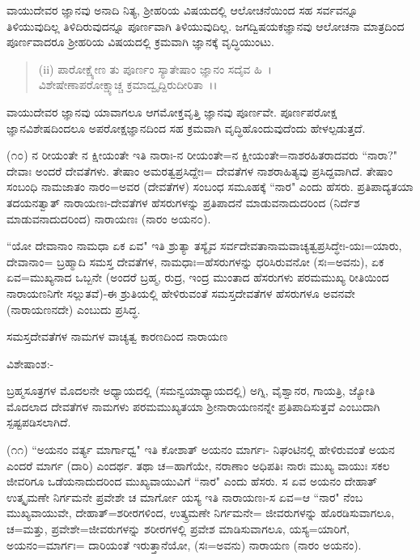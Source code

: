 ವಾಯುದೇವರ ಜ್ಞಾನವು ಅನಾದಿ ನಿತ್ಯ, ಶ‍್ರೀಹರಿಯ ವಿಷಯದಲ್ಲಿ ಆಲೋಚನೆಯಿಂದ ಸಹ ಸರ್ವವನ್ನೂ ತಿಳಿಯುವುದಿಲ್ಲ ತಿಳಿದಿರುವುದನ್ನೂ ಪೂರ್ಣವಾಗಿ ತಿಳಿಯುವುದಿಲ್ಲ. ಜಗದ್ವಿಷಯಕಜ್ಞಾನವು ಆಲೋಚನಾ ಮಾತ್ರದಿಂದ ಪೂರ್ಣವಾದರೂ ಶ‍್ರೀಹರಿಯ ವಿಷಯದಲ್ಲಿ ಕ್ರಮವಾಗಿ ಜ್ಞಾನಕ್ಕೆ ವೃದ್ಧಿಯುಂಟು.

\begin{verse}
 (ii) ಪಾರೋಕ್ಷ್ಯೇಣ ತು ಪೂರ್ಣಂ ಸ್ಯಾತೇಷಾಂ ಜ್ಞಾನಂ ಸದೈವ ಹಿ~।\\ ವಿಶೇಷೇಣಾಪರೋಕ್ಷ್ಯಾಚ್ಚ ಕ್ರಮಾದ್ವೃದ್ದಿರುದೀರಿತಾ~।।
\end{verse}


\noindent
ವಾಯುದೇವರ ಜ್ಞಾನವು ಯಾವಾಗಲೂ ಆಗಮೋಕ್ತವೃತ್ತಿ ಜ್ಞಾನವು ಪೂರ್ಣವೇ. ಪೂರ್ಣಪರೋಕ್ಷ ಜ್ಞಾನವಿಶೇಷದಿಂದಲೂ ಅಪರೋಕ್ಷಜ್ಞಾನದಿಂದ ಸಹ ಕ್ರಮವಾಗಿ ವೃದ್ಧಿಹೊಂದುವುದೆಂದು ಹೇಳಲ್ಪಡುತ್ತದೆ.

(೧೦) ನ ರೀಯಂತೇ ನ ಕ್ಷೀಯಂತೇ ಇತಿ ನಾರಾಃ-ನ ರೀಯಂತೇ=ನ ಕ್ಷೀಯಂತೇ=ನಾಶರಹಿತರಾದವರು ``ನಾರಾ?" ದೇವಾಃ ಅಂದರೆ ದೇವತೆಗಳು. ತೇಷಾಂ ಅಮರತ್ವಪ್ರಸಿದ್ದೇಃ= ದೇವತೆಗಳ ನಾಶರಾಹಿತ್ಯವು ಪ್ರಸಿದ್ದವಾಗಿದೆ. ತೇಷಾಂ ಸಂಬಂಧಿ ನಾಮಜಾತಂ ನಾರಂ=ಅವರ (ದೇವತೆಗಳ) ಸಂಬಂಧ ಸಮೂಹಕ್ಕೆ ``ನಾರ" ಎಂದು ಹೆಸರು. ಪ್ರತಿಪಾದ್ಯತಯಾ ತದಯನತ್ವಾತ್ ನಾರಾಯಣಃ-ದೇವತೆಗಳ ಹೆಸರುಗಳನ್ನು ಪ್ರತಿಪಾದನೆ ಮಾಡುವನಾದುದರಿಂದ (ನಿರ್ದೆಶ ಮಾಡುವನಾದುದರಿಂದ) ನಾರಾಯಣಃ (ನಾರಂ ಅಯನ೦).

``ಯೋ ದೇವಾನಾಂ ನಾಮಧಾ ಏಕ ಏವ" ಇತಿ ಶ್ರುತ್ಯಾ ತಸ್ಯೈವ ಸರ್ವದೇವತಾನಾಮವಾಚ್ಯತ್ವಪ್ರಸಿದ್ಧೇಃ-ಯಃ=ಯಾರು, ದೇವಾನಾಂ= ಬ್ರಹ್ಮಾದಿ ಸಮಸ್ತ ದೇವತೆಗಳ, ನಾಮಧಾಃ=ಹೆಸರುಗಳನ್ನು ಧರಿಸಿರುವನೋ (ಸಃ=ಅವನು), ಏಕ ಏವ=ಮುಖ್ಯನಾದ ಒಬ್ಬನೇ (ಅಂದರೆ ಬ್ರಹ್ಮ, ರುದ್ರ, ಇಂದ್ರ ಮುಂತಾದ ಹೆಸರುಗಳು ಪರಮಮುಖ್ಯ ರೀತಿಯಿಂದ ನಾರಾಯಣನಿಗೇ ಸಲ್ಲುತವೆ)-ಈ ಶ್ರುತಿಯಲ್ಲಿ ಹೇಳಿರುವಂತೆ ಸಮಸ್ತದೇವತೆಗಳ ಹೆಸರುಗಳೂ ಅವನವೇ (ನಾರಾಯಣನದೇ) ಎಂಬುದು ಪ್ರಸಿದ್ಧ.

\begin{center}
ಸಮಸ್ತದೇವತೆಗಳ ನಾಮಗಳ ವಾಚ್ಯತ್ವ ಕಾರಣದಿಂದ ನಾರಾಯಣ
\end{center}

\noindent
ವಿಶೇಷಾಂಶ:-

ಬ್ರಹ್ಮಸೂತ್ರಗಳ ಮೊದಲನೇ ಅಧ್ಯಾಯದಲ್ಲಿ (ಸಮನ್ವಯಾಧ್ಯಾಯದಲ್ಲಿ) ಅಗ್ನಿ, ವೈಶ್ವಾನರ, ಗಾಯತ್ರಿ, ಜ್ಯೋತಿ ಮೊದಲಾದ ದೇವತೆಗಳ ನಾಮಗಳು ಪರಮಮುಖ್ಯತಯಾ ಶ‍್ರೀನಾರಾಯಣನನ್ನೇ ಪ್ರತಿಪಾದಿಸುತ್ತವೆ ಎಂಬುದಾಗಿ ಸ್ಪಷ್ಟಪಡಿಸಲಾಗಿದೆ.

(೧೧) ``ಅಯನಂ ವರ್ತ್ಯ ಮಾರ್ಗಾಧ್ವ" ಇತಿ ಕೋಶಾತ್ ಅಯನಂ ಮಾರ್ಗಃ- ನಿಘಂಟಿನಲ್ಲಿ ಹೇಳಿರುವಂತೆ ಅಯನ ಎಂದರೆ ಮಾರ್ಗ (ದಾರಿ) ಎಂದರ್ಥ. ತಥಾ ಚ=ಹಾಗೆಯೇ, ನರಾಣಾಂ ಅಧಿಪತಿಃ ನಾರಃ ಮುಖ್ಯ ವಾಯುಃ ಸಕಲ ಜೀವರಿಗೂ ಒಡೆಯನಾದುದರಿಂದ ಮುಖ್ಯವಾಯುವಿಗೆ ``ನಾರ" ಎಂದು ಹೆಸರು. ಸ ಏವ ಅಯನಂ ದೇಹಾತ್ ಉತ್ಕೃಮಣೇ ನಿರ್ಗಮನೇ ಪ್ರವೇಶೇ ಚ ಮಾರ್ಗೋ ಯಸ್ಯ ಇತಿ ನಾರಾಯಣಃ-ಸ ಏವ=ಆ ``ನಾರ" ನೆಂಬ ಮುಖ್ಯವಾಯುವೇ, ದೇಹಾತ್=ಶರೀರಗಳಿಂದ, ಉತ್ಕ್ರಮಣೇ ನಿರ್ಗಮನೇ= ಜೀವರುಗಳನ್ನು ಹೊರಡಿಸುವಾಗಲೂ, ಚ=ಮತ್ತು, ಪ್ರವೇಶೇ=ಜೀವರುಗಳನ್ನು ಶರೀರಗಳಲ್ಲಿ ಪ್ರವೇಶ ಮಾಡಿಸುವಾಗಲೂ, ಯಸ್ಯ=ಯಾರಿಗೆ, ಅಯನಂ=ಮಾರ್ಗಃ= ದಾರಿಯಂತೆ ಇರುತ್ತಾನೆಯೋ, (ಸಃ=ಅವನು) ನಾರಾಯಣ (ನಾರಂ ಅಯನಂ).

